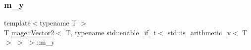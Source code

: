 \subsubsection{\texorpdfstring{m\+\_\+y}{m\_y}}
{\footnotesize\ttfamily template$<$typename T $>$ \\
T \hyperlink{structmage_1_1_vector2}{mage\+::\+Vector2}$<$ T, typename std\+::enable\+\_\+if\+\_\+t$<$ std\+::is\+\_\+arithmetic\+\_\+v$<$ T $>$ $>$ $>$\+::m\+\_\+y}

